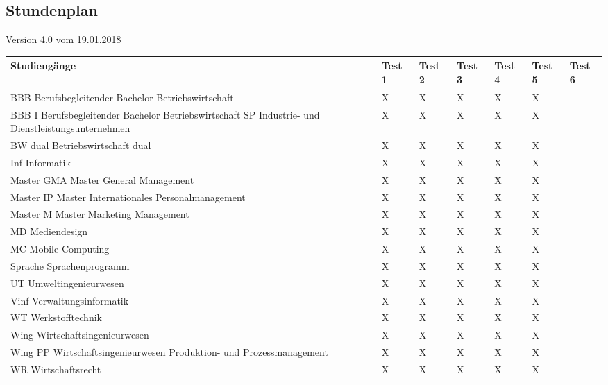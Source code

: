 \subsection{Stundenplan}
Version 4.0 vom 19.01.2018\newline
\noindent%
\begin{tabularx}{\textwidth}{|p{}|X|X|X|X|X|X| }
\hline
\textbf{Studiengänge} &\textbf{Test 1} &\textbf{Test 2} &\textbf{Test 3}&\textbf{Test 4} &\textbf{Test 5} &\textbf{Test 6}  \\ \hline 

BBB  Berufsbegleitender Bachelor Betriebswirtschaft & X & X & X & X & X &   \\ \hline
BBB I  Berufsbegleitender Bachelor Betriebswirtschaft SP Industrie- und Dienstleistungsunternehmen & X & X & X & X & X &   \\ \hline
BW dual  Betriebswirtschaft dual & X & X & X & X & X &  \\ \hline
Inf  Informatik & X & X & X & X & X &   \\ \hline
Master GMA  Master General Management & X & X & X & X & X &   \\ \hline
Master IP  Master Internationales Personalmanagement & X & X & X & X & X &  \\ \hline
Master M  Master Marketing Management & X & X & X & X & X &   \\ \hline
MD  Mediendesign & X & X & X & X & X &   \\ \hline
MC  Mobile Computing & X & X & X & X & X &  \\ \hline
Sprache  Sprachenprogramm & X & X & X & X & X &  \\ \hline
UT  Umweltingenieurwesen & X & X & X & X & X &   \\ \hline
Vinf  Verwaltungsinformatik & X & X & X & X & X &  \\ \hline
WT  Werkstofftechnik & X & X & X & X & X &  \\ \hline
Wing  Wirtschaftsingenieurwesen & X & X & X & X & X &  \\ \hline
Wing PP Wirtschaftsingenieurwesen Produktion- und Prozessmanagement & X & X & X & X & X &   \\ \hline
WR  Wirtschaftsrecht & X & X & X & X & X &  \\ \hline
\end{tabularx}
 \newline
\newline

